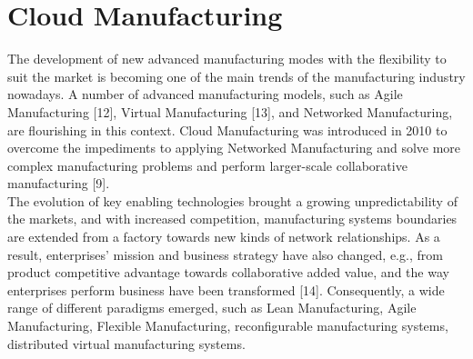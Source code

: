\section{Cloud Manufacturing}
The development of new advanced manufacturing modes with the flexibility to suit the market is becoming one of the main trends of the manufacturing industry nowadays. A number of advanced manufacturing models, such as Agile Manufacturing [12], Virtual Manufacturing [13], and Networked Manufacturing, are flourishing in this context. Cloud Manufacturing was introduced in 2010 to overcome the impediments to applying Networked Manufacturing and solve more complex manufacturing problems and perform larger-scale collaborative manufacturing [9].\\
The evolution of key enabling technologies brought a growing unpredictability of the markets, and with increased competition, manufacturing systems boundaries are extended from a factory towards new kinds of network relationships. As a result, enterprises’ mission and business strategy have also changed, e.g., from product competitive advantage towards collaborative added value, and the way enterprises perform business have been transformed [14]. Consequently, a wide range of different paradigms emerged, such as Lean Manufacturing, Agile Manufacturing, Flexible Manufacturing, reconfigurable manufacturing systems, distributed virtual manufacturing systems.\\
